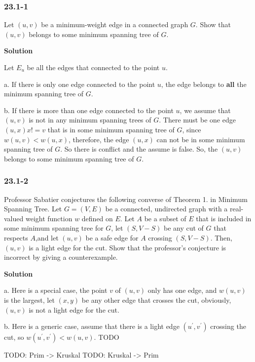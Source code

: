 \subsubsection {23.1-1}

Let $(u, v)$ be a minimum-weight edge in a connected graph $G$. Show that
$(u, v)$ belongs to some minimum spanning tree of $G$.

\textbf{Solution}

Let $E_u$ be all the edges that connected to the point $u$.

a. If there is only one edge connected to the point $u$, the edge belongs to
\textbf{all} the minimum spanning tree of $G$.

b. If there is more than one edge connected to the point $u$, we assume that
{\color{red} $(u, v)$ is not in any minimum spanning trees of $G$}. There must
be one edge $(u, x) { x != v}$ that is in some minimum spanning tree of $G$,
since $w(u, v) < w(u, x)$, therefore, the edge $(u, x)$ can not be in some
minimum spanning tree of $G$. So there is conflict and the assume is false. So,
the $(u, v)$ belongs to some minimum spanning tree of $G$.

\subsubsection {23.1-2}

Professor Sabatier conjectures the following converse of Theorem 1. in Minimum
Spanning Tree. Let $G = (V, E)$ be a connected, undirected graph with a
real-valued weight function $w$ defined on $E$. Let $A$ be a subset of $E$ that
is included in some minimum spanning tree for $G$, let $(S, V - S)$ be any cut
of $G$ that respects $A$,and let $(u, v)$ be a safe edge for $A$ crossing
$(S, V - S)$. Then, $(u, v)$ is a light edge for the cut. Show that the
professor’s conjecture is incorrect by giving a counterexample.

\textbf{Solution}

a. Here is a special case, the point $v$ of $(u, v)$ only has one edge, and
$w(u, v)$ is the largest, let $(x, y)$ be any other edge that crosses the cut,
obviously, $(u, v)$ is not a light edge for the cut.

b. Here is a generic case, assume that there is a light edge $(u^{'}, v^{'})$
crossing the cut, so $w(u^{'}, v^{'}) < w(u, v)$.
TODO




TODO: Prim -> Kruskal
TODO: Kruskal -> Prim
